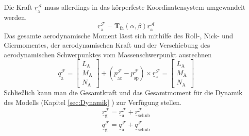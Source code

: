 Die Kraft $\underline{r}^\mathcal{A}_\mathrm{a}$ muss allerdings in das körperfeste Koordinatensystem umgewandelt werden.
\begin{equation}
\underline{r}^\mathcal{F}_\mathrm{a} = \textbf{T}_\mathrm{fa}(\alpha,\beta)\underline{r}^\mathcal{A}_\mathrm{a}
\end{equation}
Das gesamte aerodynamische Moment lässt sich mithilfe des Roll-, Nick- und Giermomentes, der aerodynamischen Kraft und der Verschiebung des aerodynamischen Schwerpunktes vom Massenschwerpunkt ausrechnen \cite{RAMYoutube_Playlist}
\begin{equation}
\underline{q}^\mathcal{F}_\mathrm{a} = \begin{bmatrix} 
L_\mathrm{A}\\
M_\mathrm{A}\\
N_\mathrm{A}
\end{bmatrix} + (\underline{p}_\mathrm{ac}^\mathcal{F}-\underline{p}_\mathrm{sp}^\mathcal{F})\times\underline{r}^\mathcal{F}_\mathrm{a} = \begin{bmatrix} 
L_\mathrm{A}\\
M_\mathrm{A}\\
N_\mathrm{A}
\end{bmatrix}
\end{equation}
Schlie{\ss}lich kann man die Gesamtkraft und das Gesamtmoment für die Dynamik des Modells (Kapitel \ref{sec:Dynamik} ) zur Verfügung stellen.
\begin{align}
\underline{r}^\mathcal{F}_\mathrm{g} = \underline{r}^\mathcal{F}_\mathrm{a} + \underline{r}^\mathcal{F}_\mathrm{schub}\\
\underline{q}^\mathcal{F}_\mathrm{g} = \underline{q}^\mathcal{F}_\mathrm{a} + \underline{q}^\mathcal{F}_\mathrm{schub}
\end{align}

